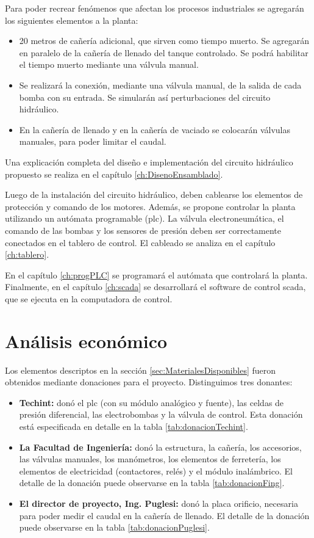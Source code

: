 Para poder recrear fenómenos que afectan los procesos industriales se agregarán
los siguientes elementos a la planta:
\begin{itemize}
\item 20 metros de cañería adicional, que sirven como tiempo
muerto.
Se agregarán en paralelo de la cañería de llenado del tanque controlado.
Se podrá habilitar el tiempo muerto mediante una válvula manual.
\item Se realizará la conexión, mediante una válvula manual, de la salida de
cada bomba con su entrada. Se simularán así perturbaciones
del circuito hidráulico.
\item En la cañería de llenado y en la cañería de vaciado se colocarán válvulas
manuales, para poder limitar el caudal.
\end{itemize}

Una explicación completa del diseño e implementación del circuito hidráulico
propuesto se realiza en el capítulo \ref{ch:DisenoEnsamblado}.

Luego de la instalación del circuito hidráulico, deben cablearse los elementos
de protección y comando de los motores.
Además, se propone controlar la planta utilizando un autómata
programable (\gls{plc}).
La válvula electroneumática, el comando de las bombas y los sensores de presión
deben ser correctamente conectados en el tablero de control.
El cableado se analiza en el capítulo \ref{ch:tablero}.

En el capítulo \ref{ch:progPLC} se programará el autómata que controlará la
planta. Finalmente, en el capítulo \ref{ch:scada} se desarrollará el software
de control \gls{scada}, que se ejecuta en la computadora de control.

\section{Análisis económico}
\label{sec:AnalisisEconomico}
Los elementos descriptos en la sección \ref{sec:MaterialesDisponibles} fueron
obtenidos mediante donaciones para el proyecto.
Distinguimos tres donantes:
\begin{itemize}
 \item \textbf{Techint:} donó el \gls{plc} (con su módulo analógico y fuente),
las celdas de presión diferencial, las electrobombas y la válvula de control.
Esta donación está especificada en detalle en la tabla
\ref{tab:donacionTechint}.
 \item \textbf{La Facultad de Ingeniería:} donó la estructura, la cañería, los
accesorios, las válvulas manuales, los manómetros, los elementos de ferretería,
los elementos de electricidad (contactores, relés) y el módulo inalámbrico.
El detalle de la donación puede observarse en la tabla \ref{tab:donacionFing}.
\item \textbf{El director de proyecto, Ing. Puglesi:} donó la placa orificio,
necesaria para poder medir el caudal en la cañería de llenado.
El detalle de la donación puede observarse en la tabla
\ref{tab:donacionPuglesi}.
\end{itemize}

